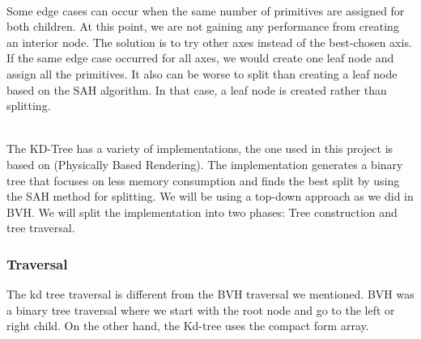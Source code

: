 \documentclass[11pt,a4paper]{article}
\begin{document}
\noindent
\\
Some edge cases can occur when the same number of primitives are assigned for both children. At this point, we are not gaining any performance from creating an interior node. The solution is to try other axes instead of the best-chosen axis. If the same edge case occurred for all axes, we would create one leaf node and assign all the primitives. It also can be worse to split than creating a leaf node based on the SAH algorithm. In that case, a leaf node is created rather than splitting. 

\noindent
\\
The KD-Tree has a variety of implementations, the one used in this project is based on (Physically Based Rendering). The implementation generates a binary tree that focuses on less memory consumption and finds the best split by using the SAH method for splitting. We will be using a top-down approach as we did in BVH. We will split the implementation into two phases: Tree construction and tree traversal.


\subsubsection{Traversal}
The kd tree traversal is different from the BVH traversal we mentioned. BVH was a binary tree traversal where we start with the root node and go to the left or right child. On the other hand, the Kd-tree uses the compact form array. 
\end{document}
